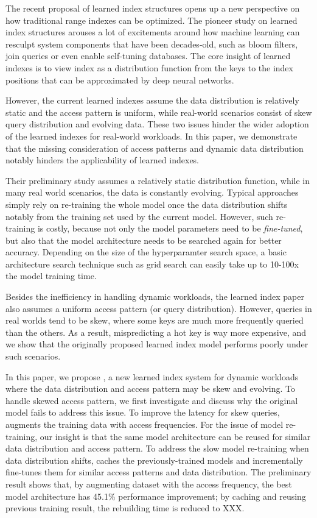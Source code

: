 \begin{englishabstract}

The recent proposal of learned index structures opens up a new perspective on how traditional range indexes can be optimized.
The pioneer study on learned index structures arouses a lot of excitements around how machine learning can resculpt system components that have been decades-old, such as bloom filters, join queries or even enable self-tuning databases.
The core insight of learned indexes is to view index as a distribution function from the keys to the index positions that can be approximated by deep neural networks.

However, the current learned indexes assume the data distribution is relatively static and the access pattern is uniform, while real-world scenarios consist of skew query distribution and evolving data.
These two issues hinder the wider adoption of the learned indexes for real-world workloads.
In this paper, we demonstrate that the missing consideration of access patterns and dynamic data distribution notably hinders the applicability of learned indexes.

Their preliminary study assumes a relatively static distribution function, while in many real world scenarios, the data is constantly evolving.
Typical approaches simply rely on re-training the whole model once the data distribution shifts notably from the training set used by the current model.
However, such re-training is costly, because not only the model parameters need to be \textit{fine-tuned}, but also that the model architecture needs to be searched again for better accuracy.
Depending on the size of the hyperparamter search space, a basic architecture search technique such as grid search can easily take up to 10-100x the model training time.

Besides the inefficiency in handling dynamic workloads, the learned index paper also assumes a uniform access pattern (or query distribution).
However, queries in real worlds tend to be skew, where some keys are much more frequently queried than the others.
As a result, mispredicting a hot key is way more expensive, and we show that the originally proposed learned index model performs poorly under such scenarios.

In this paper, we propose \sys, a new learned index system for dynamic workloads where the data distribution and access pattern may be skew and evolving.
To handle skewed access pattern, we first investigate and discuss why the original model fails to address this issue.
To improve the latency for skew queries, \sys augments the training data with access frequencies.
For the issue of model re-training, our insight is that the same model architecture can be reused for similar data distribution and access pattern.
To address the slow model re-training when data distribution shifts, \sys caches the previously-trained models and incrementally fine-tunes them for similar access patterns and data distribution.
The preliminary result shows that, by augmenting dataset with the access frequency, the best model architecture has 45.1\% performance improvement; by caching and reusing previous training result, the rebuilding time is reduced to XXX.

\end{englishabstract}
